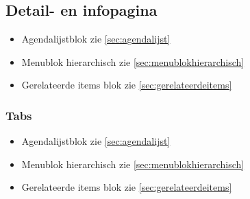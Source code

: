 \subsection{Detail- en infopagina}
\label{sec:detaileninfopagina}

\begin{itemize}
  \item Agendalijstblok zie \ref{sec:agendalijst}
  \item Menublok hierarchisch zie \ref{sec:menublokhierarchisch}
  \item Gerelateerde items blok zie \ref{sec:gerelateerdeitems}
\end{itemize}

\subsubsection{Tabs}
\label{sec:detaileninfopaginatabs}

\begin{itemize}
  \item Agendalijstblok zie \ref{sec:agendalijst}
  \item Menublok hierarchisch zie \ref{sec:menublokhierarchisch}
  \item Gerelateerde items blok zie \ref{sec:gerelateerdeitems}
\end{itemize}
